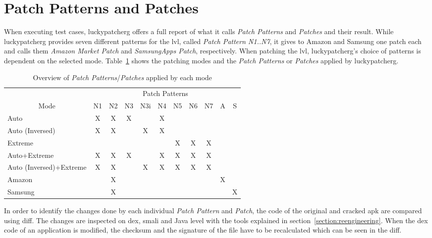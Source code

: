 \section{Patch Patterns and Patches} \label{section:luckypatcher-patterns}
When executing test cases, \gls{luckypatcherg} offers a full report of what it calls \textit{Patch Patterns} and \textit{Patches} and their result.
While \gls{luckypatcherg} provides seven different patterns for the \gls{lvl}, called \textit{Patch Pattern N1..N7}, it gives to Amazon and Samsung one patch each and calls them \textit{Amazon Market Patch} and \textit{SamsungApps Patch}, respectively.
\newline
When patching the \gls{lvl}, \gls{luckypatcherg}'s choice of patterns is dependent on the selected mode.
Table~\ref{table:patterns} shows the patching modes and the \textit{Patch Patterns} or \textit{Patches} applied by \gls{luckypatcherg}.
\begin{table}[h]
\centering
\begin{tabular}{l|cccccccccc}
              & \multicolumn{10}{c}{Patch Patterns}      \\
\multicolumn{1}{c|}{Mode} & N1 & N2 & N3 & N3i & N4 & N5 & N6 & N7 & A & S \\ \hline
Auto            & X & X & X &   & X &  &  & && \\
Auto (Inversed)      & X & X &   & X  & X &  &  & && \\
Extreme          &  &  &  &   &  & X & X & X && \\
Auto+Extreme        & X & X & X &   & X & X & X & X && \\
Auto (Inversed)+Extreme  & X & X &  & X  & X & X & X &X &&\\
Amazon        &  & X&  &   &  &  &  & & X &\\
Samsung        &  &  X&  &   &  &  &  &  & & X
\end{tabular}
\caption{Overview of \textit{Patch Patterns}/\textit{Patches} applied by each mode}
\label{table:patterns}
\end{table}
\newline
In order to identify the changes done by each individual \textit{Patch Pattern} and \textit{Patch}, the code of the original and cracked \gls{apk} are compared using diff.
The changes are inspected on dex, smali and Java level with the tools explained in section~\ref{section:reengineering}.
\newline
When the dex code of an application is modified, the checksum and the signature of the file have to be recalculated which can be seen in the diff.
